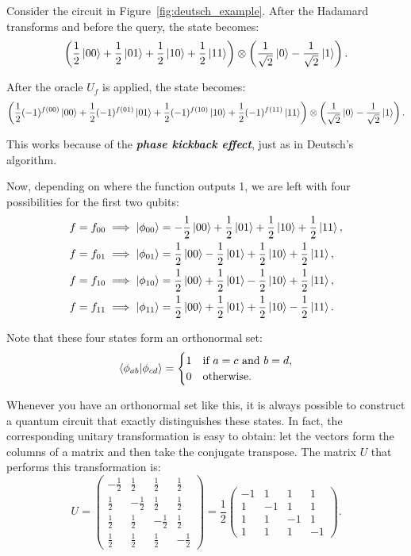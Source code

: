 \begin{example}
Consider the circuit in Figure~\ref{fig:deutsch_example}. After the Hadamard transforms and before the query, the state becomes:
\[
\left(\frac{1}{2}\ket{00} + \frac{1}{2}\ket{01} + \frac{1}{2}\ket{10} + \frac{1}{2}\ket{11}\right) \otimes \left(\frac{1}{\sqrt{2}}\ket{0} - \frac{1}{\sqrt{2}}\ket{1}\right).
\]

After the oracle $U_f$ is applied, the state becomes:
\[
\left(\frac{1}{2}(-1)^{f(00)}\ket{00} + \frac{1}{2}(-1)^{f(01)}\ket{01} + \frac{1}{2}(-1)^{f(10)}\ket{10} + \frac{1}{2}(-1)^{f(11)}\ket{11}\right) \otimes \left(\frac{1}{\sqrt{2}}\ket{0} - \frac{1}{\sqrt{2}}\ket{1}\right).
\]

This works because of the \textbf{\textit{phase kickback effect}}, just as in Deutsch’s algorithm.

Now, depending on where the function outputs 1, we are left with four possibilities for the first two qubits:
\begin{align*}
f = f_{00} &\implies \ket{\phi_{00}} = -\frac{1}{2}\ket{00} + \frac{1}{2}\ket{01} + \frac{1}{2}\ket{10} + \frac{1}{2}\ket{11}, \\
f = f_{01} &\implies \ket{\phi_{01}} = \frac{1}{2}\ket{00} - \frac{1}{2}\ket{01} + \frac{1}{2}\ket{10} + \frac{1}{2}\ket{11}, \\
f = f_{10} &\implies \ket{\phi_{10}} = \frac{1}{2}\ket{00} + \frac{1}{2}\ket{01} - \frac{1}{2}\ket{10} + \frac{1}{2}\ket{11}, \\
f = f_{11} &\implies \ket{\phi_{11}} = \frac{1}{2}\ket{00} + \frac{1}{2}\ket{01} + \frac{1}{2}\ket{10} - \frac{1}{2}\ket{11}.
\end{align*}

Note that these four states form an orthonormal set:
\[
\braket{\phi_{ab} | \phi_{cd}} = 
\begin{cases}
1 & \text{if } a = c \text{ and } b = d, \\
0 & \text{otherwise}.
\end{cases}
\]

Whenever you have an orthonormal set like this, it is always possible to construct a quantum circuit that exactly distinguishes these states. In fact, the corresponding unitary transformation is easy to obtain: let the vectors form the columns of a matrix and then take the conjugate transpose. The matrix $U$ that performs this transformation is:
\[
U = \begin{pmatrix}
-\frac{1}{2} & \frac{1}{2} & \frac{1}{2} & \frac{1}{2} \\
\frac{1}{2} & -\frac{1}{2} & \frac{1}{2} & \frac{1}{2} \\
\frac{1}{2} & \frac{1}{2} & -\frac{1}{2} & \frac{1}{2} \\
\frac{1}{2} & \frac{1}{2} & \frac{1}{2} & -\frac{1}{2}
\end{pmatrix}=\frac{1}{2}\begin{pmatrix}
    -1 & 1 & 1 & 1 \\
    1 & -1 & 1 & 1 \\
    1 & 1 & -1 & 1 \\
    1 & 1 & 1 & -1
\end{pmatrix}.
\]


\end{example}
